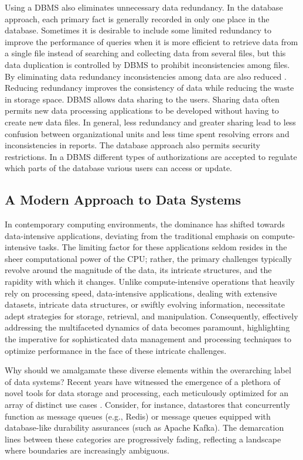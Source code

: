 Using a DBMS also eliminates unnecessary data redundancy. In the database
approach, each primary fact is generally recorded in only one place in the
database. Sometimes it is desirable to include some limited redundancy to
improve the performance of queries when it is more efficient to retrieve data
from a single file instead of searching and collecting data from several files,
but this data duplication is controlled by DBMS to prohibit inconsistencies
among files. By eliminating data redundancy inconsistencies among data are also
reduced \cite{elmasri1998}. Reducing redundancy improves the consistency of data
while reducing the waste in storage space. DBMS allows data sharing to the
users. Sharing data often permits new data processing applications to be
developed without having to create new data files. In general, less redundancy
and greater sharing lead to less confusion between organizational units and less
time spent resolving errors and inconsistencies in reports. The database
approach also permits security restrictions. In a DBMS different types of
authorizations are accepted to regulate which parts of the database various
users can access or update.

\subsection{A Modern Approach to Data Systems}
In contemporary computing environments, the dominance has shifted towards
data-intensive applications, deviating from the traditional emphasis on
compute-intensive tasks. The limiting factor for these applications seldom
resides in the sheer computational power of the CPU; rather, the primary
challenges typically revolve around the magnitude of the data, its intricate
structures, and the rapidity with which it changes. Unlike compute-intensive
operations that heavily rely on processing speed, data-intensive applications,
dealing with extensive datasets, intricate data structures, or swiftly evolving
information, necessitate adept strategies for storage, retrieval, and
manipulation. Consequently, effectively addressing the multifaceted dynamics of
data becomes paramount, highlighting the imperative for sophisticated data
management and processing techniques to optimize performance in the face of
these intricate challenges.

Why should we amalgamate these diverse elements within the overarching label of
data systems? Recent years have witnessed the emergence of a plethora of novel
tools for data storage and processing, each meticulously optimized for an array
of distinct use cases \cite{stonebraker2005onesize}. Consider, for instance,
datastores that concurrently function as message queues (e.g., Redis) or message
queues equipped with database-like durability assurances (such as Apache Kafka).
The demarcation lines between these categories are progressively fading,
reflecting a landscape where boundaries are increasingly ambiguous.

